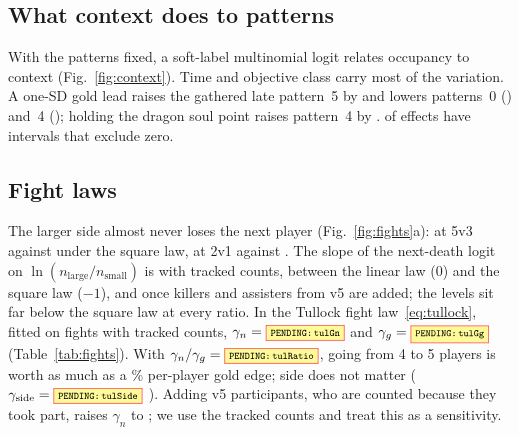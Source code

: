 \subsection{What context does to patterns}
\label{sec:context}


With the patterns fixed, a soft-label multinomial logit relates occupancy to context (Fig.~\ref{fig:context}).
Time and objective class carry most of the variation.
A one-SD gold lead raises the gathered late pattern~5 by   and lowers patterns~0 () and~4 (); holding the dragon soul point raises pattern~4 by  .
 of  effects have intervals that exclude zero.

\subsection{Fight laws}
\label{sec:fights}


The larger side almost never loses the next player (Fig.~\ref{fig:fights}a):  at 5v3 against  under the square law,  at 2v1 against .
The slope of the next-death logit on $\ln(n_{\mathrm{large}}/n_{\mathrm{small}})$ is   with tracked counts, between the linear law (0) and the square law ($-1$), and   once killers and assisters from v5 are added; the levels sit far below the square law at every ratio.
In the Tullock fight law~\eqref{eq:tullock}, fitted on  fights with tracked counts, $\gamma_n=\V{tulGn}$  and $\gamma_g=\V{tulGg}$  (Table~\ref{tab:fights}).
With $\gamma_n/\gamma_g=\V{tulRatio}$, going from 4 to 5 players is worth as much as a \% per-player gold edge; side does not matter ($\gamma_{\mathrm{side}}=\V{tulSide}$ ).
Adding v5 participants, who are counted because they took part, raises $\gamma_n$ to ; we use the tracked counts and treat this as a sensitivity.

